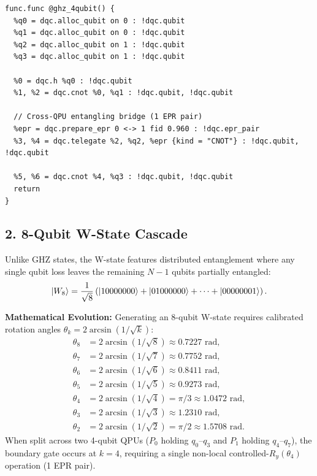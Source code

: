 \begin{lstlisting}[language=MLIR, caption={Distributed GHZ-4 State in DQC MLIR}]
func.func @ghz_4qubit() {
  %q0 = dqc.alloc_qubit on 0 : !dqc.qubit
  %q1 = dqc.alloc_qubit on 0 : !dqc.qubit
  %q2 = dqc.alloc_qubit on 1 : !dqc.qubit
  %q3 = dqc.alloc_qubit on 1 : !dqc.qubit

  %0 = dqc.h %q0 : !dqc.qubit
  %1, %2 = dqc.cnot %0, %q1 : !dqc.qubit, !dqc.qubit
  
  // Cross-QPU entangling bridge (1 EPR pair)
  %epr = dqc.prepare_epr 0 <-> 1 fid 0.960 : !dqc.epr_pair
  %3, %4 = dqc.telegate %2, %q2, %epr {kind = "CNOT"} : !dqc.qubit, !dqc.qubit
  
  %5, %6 = dqc.cnot %4, %q3 : !dqc.qubit, !dqc.qubit
  return
}
\end{lstlisting}

\subsection{2. 8-Qubit W-State Cascade}
Unlike GHZ states, the W-state features distributed entanglement where any single qubit loss leaves the remaining $N-1$ qubits partially entangled:
\begin{equation}
    \ket{W_8} = \frac{1}{\sqrt{8}} \left( \ket{10000000} + \ket{01000000} + \dots + \ket{00000001} \right).
    \label{eq:w8_def_ch10}
\end{equation}

\noindent \textbf{Mathematical Evolution:}
Generating an 8-qubit W-state requires calibrated rotation angles $\theta_k = 2 \arcsin(1/\sqrt{k})$:
\begin{align}
    \theta_8 &= 2 \arcsin(1/\sqrt{8}) \approx 0.7227\text{ rad}, \\
    \theta_7 &= 2 \arcsin(1/\sqrt{7}) \approx 0.7752\text{ rad}, \\
    \theta_6 &= 2 \arcsin(1/\sqrt{6}) \approx 0.8411\text{ rad}, \\
    \theta_5 &= 2 \arcsin(1/\sqrt{5}) \approx 0.9273\text{ rad}, \\
    \theta_4 &= 2 \arcsin(1/\sqrt{4}) = \pi/3 \approx 1.0472\text{ rad}, \\
    \theta_3 &= 2 \arcsin(1/\sqrt{3}) \approx 1.2310\text{ rad}, \\
    \theta_2 &= 2 \arcsin(1/\sqrt{2}) = \pi/2 \approx 1.5708\text{ rad}.
\end{align}
When split across two 4-qubit QPUs ($P_0$ holding $q_0\text{--}q_3$ and $P_1$ holding $q_4\text{--}q_7$), the boundary gate occurs at $k=4$, requiring a single non-local controlled-$R_y(\theta_4)$ operation (1 EPR pair).

